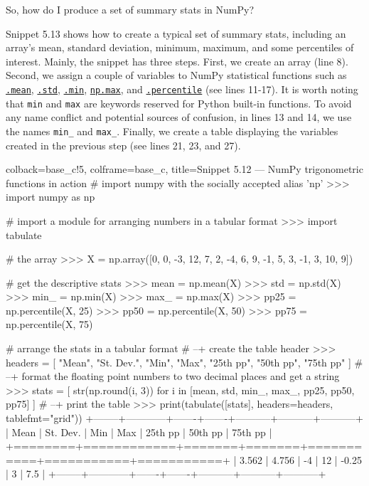 \documentclass[a4paper,11pt]{book}
\newcommand{\question}[1]{%
    \begin{tcolorbox}[colback=comp_c!10,colframe=comp_c,sidebyside align=top,width=\linewidth,before skip=1ex]
        #1
    \end{tcolorbox}
    \switchcolumn%
}
\newcommand{\note}[1]{%
    \begin{tcolorbox}[colback=white!0,colframe=white!10,width=\linewidth,before skip=1ex]
        #1
    \end{tcolorbox}
}
\begin{document}
\clearpage
\begin{paracol}{2}
	\question{\raggedright So, how do I produce a set of summary stats in NumPy?}
	\note{Snippet 5.13 shows how to create a typical set of summary stats, including an array's mean, standard deviation, minimum, maximum, and some percentiles of interest. Mainly, the snippet has three steps. First, we create an array (line 8). Second, we assign a couple of variables to NumPy statistical functions such as \href{https://numpy.org/doc/stable/reference/generated/numpy.mean.html\#numpy.mean}{\texttt{.mean}}, \href{https://numpy.org/doc/stable/reference/generated/numpy.std.html\#numpy.std}{\texttt{.std}}, \href{https://numpy.org/doc/stable/reference/generated/numpy.ndarray.min.html}{\texttt{.min}}, \href{https://numpy.org/doc/stable/reference/generated/numpy.ndarray.max.html}{\texttt{np.max}}, and \href{https://numpy.org/doc/stable/reference/generated/numpy.percentile. html\#numpy.percentile}{\texttt{.percentile}} (see lines 11-17). It is worth noting that \texttt{min} and \texttt{max} are keywords reserved for Python built-in functions. To avoid any name conflict and potential sources of confusion, in lines 13 and 14, we use the names \texttt{min\_} and \texttt{max\_}. Finally, we create a table displaying the variables created in the previous step (see lines 21, 23, and 27).} 
\end{paracol}

\begin{pythoncode}[linenos=true,]{colback=base_c!5, colframe=base_c, title=\sffamily Snippet 5.12 --- NumPy trigonometric functions in action}
# import numpy with the socially accepted alias 'np'
>>> import numpy as np

# import a module for arranging numbers in a tabular format
>>> import tabulate

# the array 
>>> X = np.array([0, 0, -3, 12, 7, 2, -4, 6, 9, -1, 5, 3, -1, 3, 10, 9])

# get the descriptive stats
>>> mean = np.mean(X)
>>> std = np.std(X)
>>> min_ = np.min(X)
>>> max_ = np.max(X)
>>> pp25 = np.percentile(X, 25)
>>> pp50 = np.percentile(X, 50)
>>> pp75 = np.percentile(X, 75)

# arrange the stats in a tabular format
# --+ create the table header
>>> headers = [
	"Mean", "St. Dev.", "Min", "Max", "25th pp", "50th pp", "75th pp"
	]
# --+ format the floating point numbers to two decimal places and get a string 
>>> stats = [
	str(np.round(i, 3)) for i in [mean, std, min_, max_, pp25, pp50, pp75]
	]
# --+ print the table
>>> print(tabulate([stats], headers=headers, tablefmt="grid"))
+--------+------------+-------+-------+-----------+-----------+-----------+
|   Mean |   St. Dev. |   Min |   Max |   25th pp |   50th pp |   75th pp |
+========+============+=======+=======+===========+===========+===========+
|  3.562 |      4.756 |    -4 |    12 |     -0.25 |         3 |       7.5 |
+--------+------------+-------+-------+-----------+-----------+-----------+
\end{pythoncode}
\end{document}
